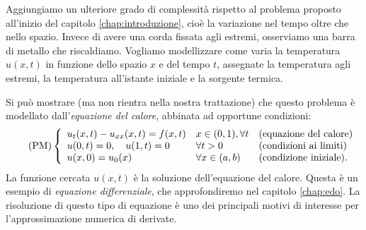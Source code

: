 Aggiungiamo un ulteriore grado di complessità rispetto al problema proposto all'inizio del capitolo \ref{chap:introduzione}, cioè la variazione nel tempo oltre che nello spazio.
Invece di avere una corda fissata agli estremi, osserviamo una barra di metallo che riscaldiamo. Vogliamo modellizzare come varia la temperatura $u( x,t)$ in funzione dello spazio $x$ e del tempo $t$, assegnate la temperatura agli estremi, la temperatura all'istante iniziale e la sorgente termica.

Si può mostrare (ma non rientra nella nostra trattazione) che questo problema è modellato dall'\textit{equazione del calore}, abbinata ad opportune condizioni:
\begin{equation}\tag{PM}\label{eq:pm-calore}
\left\{\begin{array}{ l l l }
u_{t}( x,t) -u_{xx}( x,t) =f( x,t)  & x\in ( 0,1) ,\forall t & \text{(equazione del calore)}\\
u( 0,t) =0,\quad u( 1,t) =0 & \forall t >0 & \text{(condizioni ai limiti)}\\
u( x,0) =u_{0}(x) & \forall x\in ( a,b) & \text{(condizione iniziale).}
\end{array}\right.
\end{equation}
La funzione cercata $u( x,t)$ è la soluzione dell'equazione del calore.
Questa è un esempio di \textit{equazione differenziale}, che approfondiremo nel capitolo \ref{chap:edo}.
La risoluzione di questo tipo di equazione è uno dei principali motivi di interesse per l'approssimazione numerica di derivate.

